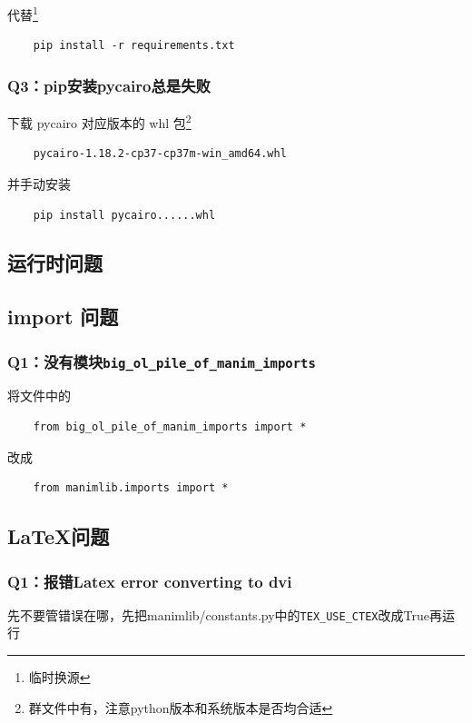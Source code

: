 \documentclass[a4paper]{article}
\begin{document}
代替\footnote{临时换源}
\begin{verbatim}
    pip install -r requirements.txt
\end{verbatim}

\subsubsection*{Q3：pip安装pycairo总是失败}

下载 pycairo 对应版本的 whl 包\footnote{群文件中有，注意python版本和系统版本是否均合适}
\begin{verbatim}
    pycairo-1.18.2-cp37-cp37m-win_amd64.whl
\end{verbatim}

并手动安装
\begin{verbatim}
    pip install pycairo......whl
\end{verbatim}

\newpage

\begin{center}
    \section{运行时问题}
\end{center}

\subsection{import 问题}
\subsubsection*{Q1：没有模块\texttt{big\_ol\_pile\_of\_manim\_imports}}

将文件中的
\begin{verbatim}
    from big_ol_pile_of_manim_imports import *
\end{verbatim}

改成
\begin{verbatim}
    from manimlib.imports import *
\end{verbatim}

\subsection{\LaTeX 问题}
\subsubsection*{Q1：报错Latex error converting to dvi}
先不要管错误在哪，先把manimlib/constants.py中的\texttt{TEX\_USE\_CTEX}改成True再运行
\end{document}
